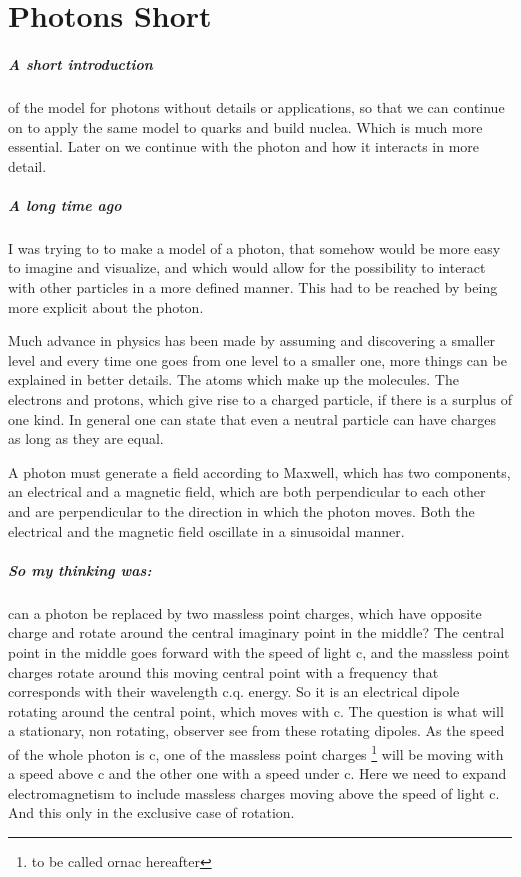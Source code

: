 \chapter{Photons Short}

\paragraph{
A short introduction} of the model for photons without details or applications, so that we can continue on to apply the same model to quarks and build nuclea. Which is much more essential. Later on we continue with the photon and how it interacts in more detail.

\paragraph{
A long time ago} I was trying to to make a model of a photon, that somehow would be more easy to imagine and visualize,  and which would allow for the possibility to interact with other particles in a more defined manner. This had to be reached by being more explicit about the photon.

Much advance in physics has been made by assuming and discovering a smaller level and every time one goes from one level to a smaller one, more things can be explained in better details. The atoms which make up the molecules. The electrons and protons, which give rise to a charged particle, if there is a surplus of one kind. In general one can state that even a neutral particle can have charges as long as they are equal.




A photon must generate a field according to Maxwell, which has two components, an electrical and a magnetic field, which are both perpendicular to each other and are perpendicular to the direction in which the photon moves. Both the electrical and the magnetic field oscillate in a sinusoidal manner.

\paragraph{
So my thinking was:} can a photon be replaced by two massless point charges, which have opposite charge and rotate around the central imaginary point in the middle? The central point in the middle goes forward with the speed of light c, and the massless point charges rotate around this moving central point with a frequency that corresponds with their wavelength c.q. energy.
So it is an electrical dipole rotating around the central point, which moves with c.
The question is what will a stationary, non rotating, observer see from these rotating dipoles. As the speed of the whole photon is c, one of the massless point charges \footnote{to be called ornac hereafter} will be moving with a speed above c and the other one with a speed under c.
Here we need to expand electromagnetism to include massless charges moving above the speed of light c. And this only in the exclusive case of rotation.

